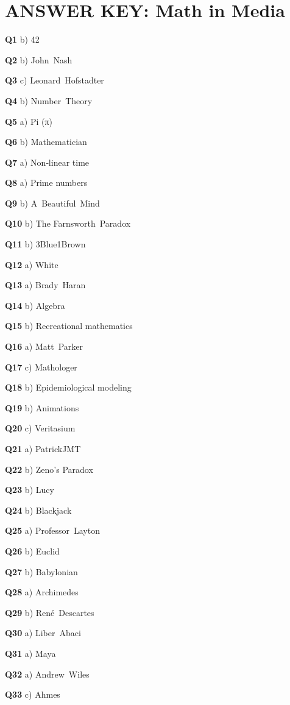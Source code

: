 \section{ANSWER KEY: Math in Media}

\textbf{Q1} b) 42\par
\textbf{Q2} b) John Nash\par
\textbf{Q3} c) Leonard Hofstadter\par
\textbf{Q4} b) Number Theory\par
\textbf{Q5} a) Pi (π)\par
\textbf{Q6} b) Mathematician\par
\textbf{Q7} a) Non‑linear time\par
\textbf{Q8} a) Prime numbers\par
\textbf{Q9} b) A Beautiful Mind\par
\textbf{Q10} b) The Farnsworth Paradox\par
\textbf{Q11} b) 3Blue1Brown\par
\textbf{Q12} a) White\par
\textbf{Q13} a) Brady Haran\par
\textbf{Q14} b) Algebra\par
\textbf{Q15} b) Recreational mathematics\par
\textbf{Q16} a) Matt Parker\par
\textbf{Q17} c) Mathologer\par
\textbf{Q18} b) Epidemiological modeling\par
\textbf{Q19} b) Animations\par
\textbf{Q20} c) Veritasium\par
\textbf{Q21} a) PatrickJMT\par
\textbf{Q22} b) Zeno's Paradox\par
\textbf{Q23} b) Lucy\par
\textbf{Q24} b) Blackjack\par
\textbf{Q25} a) Professor Layton\par
\textbf{Q26} b) Euclid\par
\textbf{Q27} b) Babylonian\par
\textbf{Q28} a) Archimedes\par
\textbf{Q29} b) René Descartes\par
\textbf{Q30} a) Liber Abaci\par
\textbf{Q31} a) Maya\par
\textbf{Q32} a) Andrew Wiles\par
\textbf{Q33} c) Ahmes\par
